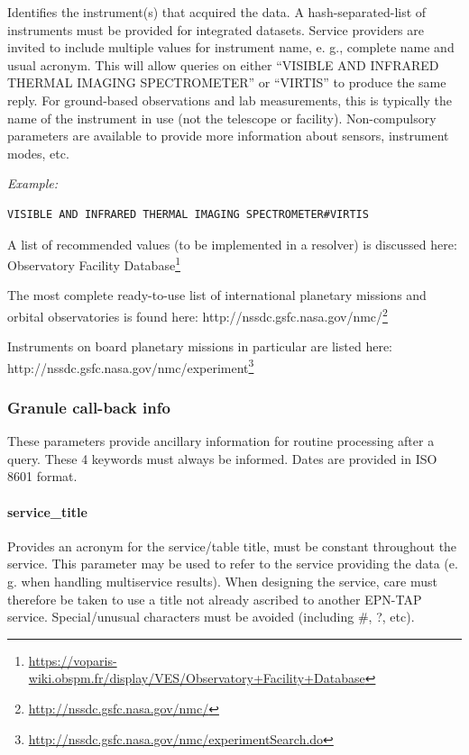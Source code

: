 \documentclass[11pt,a4paper]{ivoa}
\begin{document}
Identifies the instrument(s) that acquired the data. A hash-separated-list of instruments must be provided for integrated datasets. Service providers are invited to include multiple values for instrument name, e. g., complete name and usual acronym. This will allow queries on either ``VISIBLE AND INFRARED THERMAL IMAGING SPECTROMETER'' or ``VIRTIS'' to produce the same reply. For ground-based observations and lab measurements, this is typically the name of the instrument in use (not the telescope or facility). Non-compulsory parameters are available to provide more information about sensors, instrument modes, etc.

\emph{\emph{Example:}}

\begin{verbatim}
VISIBLE AND INFRARED THERMAL IMAGING SPECTROMETER#VIRTIS
\end{verbatim}

A list of recommended values (to be implemented in a resolver) is discussed here: Observatory Facility Database\footnote{\url{https://voparis-wiki.obspm.fr/display/VES/Observatory+Facility+Database}}

The most complete ready-to-use list of international planetary missions and orbital observatories is found here: http://nssdc.gsfc.nasa.gov/nmc/\footnote{\url{http://nssdc.gsfc.nasa.gov/nmc/}}

Instruments on board planetary missions in particular are listed here: \\http://nssdc.gsfc.nasa.gov/nmc/experiment\footnote{\url{http://nssdc.gsfc.nasa.gov/nmc/experimentSearch.do}}

\subsubsection{Granule call-back info}

These parameters provide ancillary information for routine processing after a query. These 4 keywords must always be informed. Dates are provided in ISO 8601 format. 

\paragraph{service\_title}

Provides an acronym for the service/table title, must be constant throughout the service. This parameter may be used to refer to the service providing the data (e. g. when handling multiservice results). When designing the service, care must therefore be taken to use a title not already ascribed to another EPN-TAP service. Special/unusual characters must be avoided (including \#, ?, etc).
\end{document}
